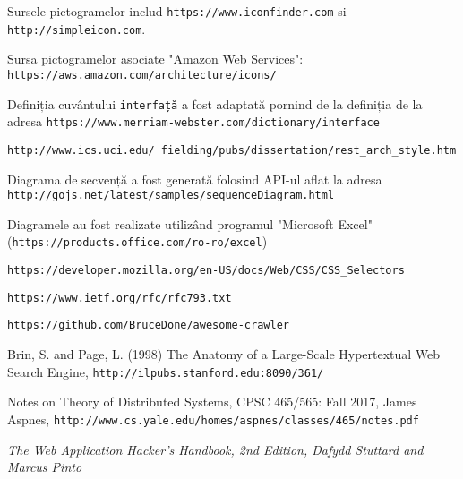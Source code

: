 \begin{thebibliography}{99}
Sursele pictogramelor includ \texttt{https://www.iconfinder.com} si \texttt{http://simpleicon.com}.

Sursa pictogramelor asociate "Amazon Web Services": \texttt{https://aws.amazon.com/architecture/icons/}

Definiția cuvântului \texttt{interfață} a fost adaptată pornind de la definiția de la adresa \texttt{https://www.merriam-webster.com/dictionary/interface}

\texttt{http://www.ics.uci.edu/~fielding/pubs/dissertation/rest\_arch\_style.htm}

Diagrama de secvență a fost generată folosind API-ul aflat la adresa \texttt{http://gojs.net/latest/samples/sequenceDiagram.html}

Diagramele au fost realizate utilizând programul "Microsoft Excel" (\texttt{https://products.office.com/ro-ro/excel})

\texttt{https://developer.mozilla.org/en-US/docs/Web/CSS/CSS\_Selectors}

\texttt{https://www.ietf.org/rfc/rfc793.txt}

\texttt{https://github.com/BruceDone/awesome-crawler}

Brin, S. and Page, L. (1998) The Anatomy of a Large-Scale Hypertextual Web Search Engine, \texttt{http://ilpubs.stanford.edu:8090/361/}

Notes on Theory of Distributed Systems, CPSC 465/565: Fall 2017, James Aspnes, \texttt{http://www.cs.yale.edu/homes/aspnes/classes/465/notes.pdf}

\textit{The Web Application Hacker's Handbook, 2nd Edition, Dafydd Stuttard and Marcus Pinto}

\end{thebibliography}